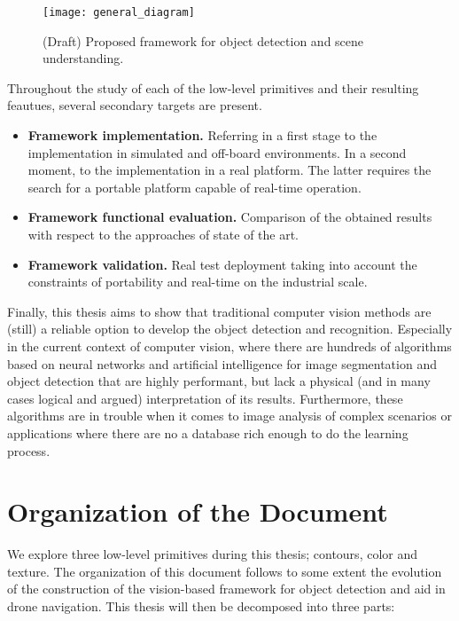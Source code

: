 \begin{figure}[!ht]
    \centering
    \texttt{[image: general\_diagram]}        
    \caption{(Draft) Proposed framework for object detection and scene understanding.}\label{fig:general_diagram_framework}
\end{figure}

Throughout the study of each of the low-level primitives and their resulting feautues, several secondary targets are present.

\begin{itemize}
	\item \textbf{Framework implementation.} Referring in a first stage to the implementation in simulated and off-board environments. In a second moment, to the implementation in a real platform. The latter requires the search for a portable platform capable of real-time operation.
 
	\item \textbf{Framework functional evaluation.} Comparison of the obtained results with respect to the approaches of state of the art.
 
 	\item \textbf{Framework validation.} Real test deployment taking into account the constraints of portability and real-time on the industrial scale.
 
\end{itemize}

Finally, this thesis aims to show that traditional computer vision methods are (still) a reliable option to develop the object detection and recognition. Especially in the current context of computer vision, where there are hundreds of algorithms based on neural networks and artificial intelligence for image segmentation and object detection that are highly performant, but lack a physical (and in many cases logical and argued) interpretation of its results. Furthermore, these algorithms are in trouble when it comes to image analysis of complex scenarios or applications where there are no a database rich enough to do the learning process.


\section*{Organization of the Document}
We explore three low-level primitives during this thesis; contours, color and texture. The organization of this document follows to some extent the evolution of the construction of the vision-based framework for object detection and aid in drone navigation. This thesis will then be decomposed into three parts:

